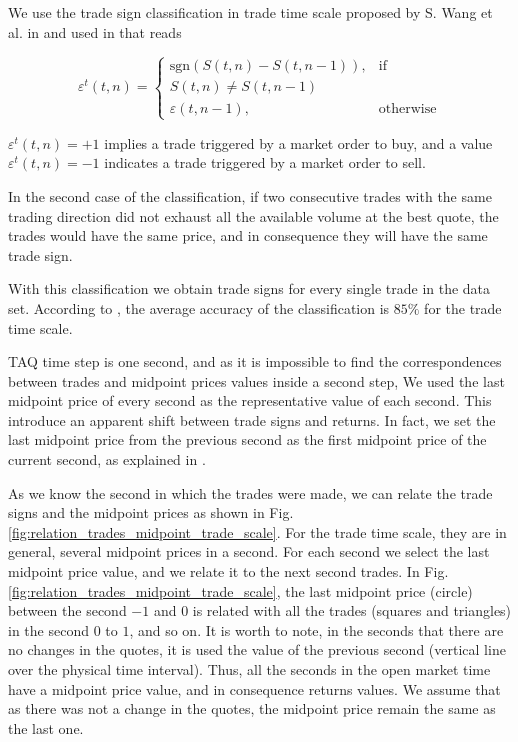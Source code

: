 We use the trade sign classification in trade time scale proposed by S. Wang et
al. in \cite{Wang_2016_cross} and used in
\cite{Wang_2016_avg,Wang_2017,Wang_2018_copulas} that reads

\begin{equation}\label{eq:trade_signs_trade}
    \varepsilon^{t}\left(t,n\right)=\left\{
    \begin{array}{cc}
    \text{sgn}\left(S\left(t,n\right)-S\left(t,n-1\right)\right),
    & \text{if }\\ S\left(t,n\right) \ne S\left(t,n-1\right)\\
    \varepsilon\left(t,n-1\right),
    & \text{otherwise}
    \end{array}\right.
\end{equation}

$\varepsilon^{t}\left( t,n \right) = +1$ implies a trade triggered by a market
order to buy, and a value $\varepsilon^{t}\left( t,n \right) = -1$ indicates a
trade triggered by a market order to sell.

In the second case of the classification, if two consecutive trades with the
same trading direction did not exhaust all the available volume at the best
quote, the trades would have the same price, and in consequence they will have
the same trade sign.

With this classification we obtain trade signs for every single trade in the
data set. According to \cite{Wang_2016_cross}, the average accuracy of the
classification is $85\%$ for the trade time scale.

TAQ time step is one second, and as it is impossible to find the
correspondences between trades and midpoint prices values inside a second step,
We used the last midpoint price of every second as the representative value of
each second. This introduce an apparent shift between trade signs and returns.
In fact, we set the last midpoint price from the previous second as the first
midpoint price of the current second, as explained in \cite{Wang_2016_cross}.

As we know the second in which the trades were made, we can relate the trade
signs and the midpoint prices as shown in Fig.
\ref{fig:relation_trades_midpoint_trade_scale}. For the trade time scale, they
are in general, several midpoint prices in a second. For each second we
select the last midpoint price value, and we relate it to the next second
trades. In Fig. \ref{fig:relation_trades_midpoint_trade_scale}, the last
midpoint price (circle) between the second $-1$ and $0$ is related with all the
trades (squares and triangles) in the second $0$ to $1$, and so on. It is worth
to note, in the seconds that there are no changes in the quotes, it is used the
value of the previous second (vertical line over the physical time interval).
Thus, all the seconds in the open market time have a midpoint price value, and
in consequence returns values. We assume that as there was not a change in the
quotes, the midpoint price remain the same as the last one.

